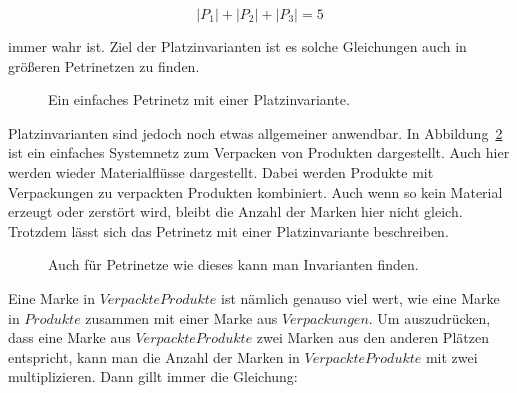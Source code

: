 		$$|P_1| + |P_2| + |P_3| = 5$$

		immer wahr ist.	Ziel der Platzinvarianten ist es solche Gleichungen auch in größeren Petrinetzen zu finden.

		\begin{figure}[h]
			\centering
			\caption{Ein einfaches Petrinetz mit einer Platzinvariante.}
			\label{fig:exinvariantsimple}
		\end{figure}
		
		Platzinvarianten sind jedoch noch etwas allgemeiner anwendbar. In Abbildung~\ref{fig:exinvariant} ist ein einfaches Systemnetz zum Verpacken von Produkten dargestellt. Auch hier werden wieder Materialflüsse dargestellt. Dabei werden Produkte mit Verpackungen zu verpackten Produkten kombiniert. Auch wenn so kein Material erzeugt oder zerstört wird, bleibt die Anzahl der Marken hier nicht gleich. Trotzdem lässt sich das Petrinetz mit einer Platzinvariante beschreiben.

		\begin{figure}[h]
			\centering
			\caption{Auch für Petrinetze wie dieses kann man Invarianten finden.}
			\label{fig:exinvariant}
		\end{figure}
		
		Eine Marke in $Verpackte Produkte$ ist nämlich genauso viel wert, wie eine Marke in $Produkte$ zusammen mit einer Marke aus $Verpackungen$. Um auszudrücken, dass eine Marke aus $Verpackte Produkte$ zwei Marken aus den anderen Plätzen entspricht, kann man die Anzahl der Marken in $Verpackte Produkte$ mit zwei multiplizieren. Dann gillt immer die Gleichung:

